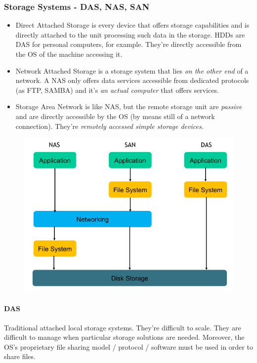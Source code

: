 \documentclass[10pt,a4paper]{article}
\begin{document}
				\subsubsection{Storage Systems - DAS, NAS, SAN}
					\begin{itemize}
						\item Direct Attached Storage is every device that offers storage capabilities and is directly attached to the unit processing such data in the storage. HDDs are DAS for personal computers, for example. They're directly accessible from the OS of the machine accessing it.
						\item Network Attached Storage is a storage system that lies \emph{on the other end} of a network. A NAS only offers data services accessible from dedicated protocols (as FTP, SAMBA) and it's \emph{an actual computer} that offers services.
						\item Storage Area Network is like NAS, but the remote storage unit are \emph{passive} and are directly accessible by the OS (by means still of a network connection). They're \emph{remotely accessed simple storage devices}.
					\end{itemize}
					\begin{figure}
						\centering
						\includegraphics[width = \textwidth]{./images/storage.png}
					\end{figure}
					
					\paragraph{DAS}
						Traditional attached local storage systems. They're difficult to scale. They are difficult to manage when particular storage solutions are needed. Moreover, the OS's proprietary file sharing model / protocol / software must be used in order to share files.
						
\end{document}
